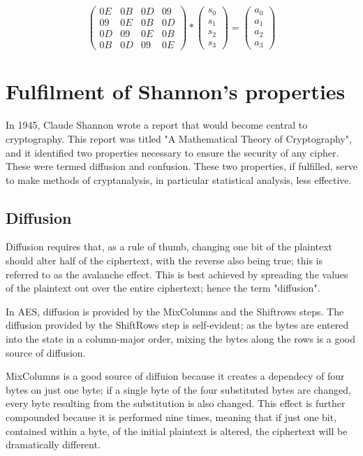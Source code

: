 \documentclass[12pt]{report}
\theoremstyle{definition}
\theoremstyle{remark}
\begin{document}
\[ \left( \begin{array}{cccc}
0E & 0B & 0D & 09 \\
09 & 0E & 0B & 0D \\
0D & 09 & 0E & 0B \\
0B & 0D & 09 & 0E\end{array} \right)
*
\left( \begin{array}{c}
s_0 \\
s_1 \\
s_2 \\
s_3\end{array} \right)
=
\left( \begin{array}{c}
a_0 \\
a_1 \\
a_2 \\
a_3\end{array} \right)
\]

\section{Fulfilment of Shannon's properties}
In 1945, Claude Shannon wrote a report that would become central to cryptography. This report was titled "A Mathematical Theory of Cryptography", and it identified two properties necessary to ensure the security of any cipher\cite{ShannonProperties}. These were termed diffusion and confusion. These two properties, if fulfilled, serve to make methods of cryptanalysis, in particular statistical analysis, less effective.

\subsection{Diffusion}
Diffusion requires that, as a rule of thumb, changing one bit of the plaintext should alter half of the ciphertext, with the reverse also being true; this is referred to as the avalanche effect\cite{AvalancheEffect}. This is best achieved by spreading the values of the plaintext out over the entire ciphertext; hence the term "diffusion".

In AES, diffusion is  provided by the MixColumns and the Shiftrows steps. The diffusion provided by the ShiftRows step is self-evident; as the bytes are entered into the state in a column-major order, mixing the bytes along the rows is a good source of diffusion.

MixColumns is a good source of diffuion because it creates a dependecy of four bytes on just one byte; if a single byte of the four substituted bytes are changed, every byte resulting from the substitution is also changed. This effect is further compounded because it is performed nine times, meaning that if just one bit, contained within a byte, of the initial plaintext is altered, the ciphertext will be dramatically different.
\end{document}
